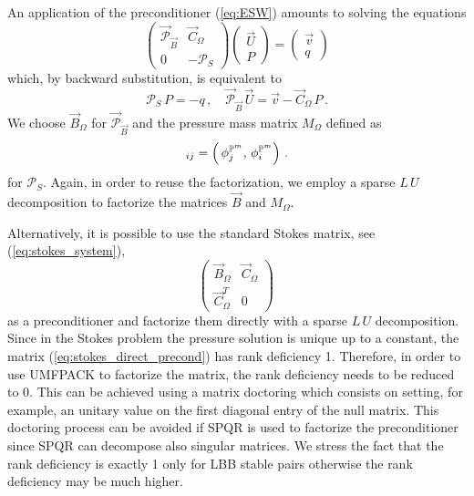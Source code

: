 An application of the preconditioner (\ref{eq:ESW}) amounts to solving the
equations
\begin{equation*}
\begin{pmatrix}
\vec{\mathcal{P}}_{\vec B} & \vec C_\Omega \\
0 & -\mathcal{P}_S
\end{pmatrix}
\begin{pmatrix} \vec U \\ P \end{pmatrix}
= \begin{pmatrix} \vec v \\ q \end{pmatrix}
\end{equation*}
which, by backward substitution, is equivalent to
\begin{equation}\label{eq:blocksolution}
\mathcal{P}_S\,P = -q\,,\quad \vec{\mathcal{P}}_{\vec B}\,\vec U = \vec v -
\vec C_\Omega\,P\,.
\end{equation}
We choose $\vec B_\Omega$  for $\vec{\mathcal{P}}_{\vec B}$ and the pressure
mass matrix $M_\Omega$ defined as
\begin{equation*}
[M_\Omega]_{ij} = \left(\,\phi_j^{\pspace^m},\, \phi_i^{\pspace^m}\right)\,.
\end{equation*}
for $\mathcal{P}_S$. Again, in order to reuse the factorization, we employ a
sparse $L\,U$ decomposition to factorize the matrices $\vec B$ and $M_\Omega$.

Alternatively, it is possible to use the standard Stokes matrix, see
(\ref{eq:stokes_system}),
\begin{equation}\label{eq:stokes_direct_precond}
\begin{pmatrix}
\vec B_\Omega & \vec C_\Omega \\
\vec C_\Omega^T & 0
\end{pmatrix}\,
\end{equation}
as a preconditioner and factorize them directly with a sparse $L\,U$
decomposition. Since in the Stokes problem the pressure solution is unique up
to a constant, the matrix (\ref{eq:stokes_direct_precond}) has rank deficiency
1. Therefore, in order to use UMFPACK to factorize the matrix, the rank
deficiency needs to be reduced to 0. This can be achieved using a matrix
doctoring which consists on setting, for example, an unitary value on the first
diagonal entry of the null matrix. This doctoring process can be avoided if SPQR
is used to factorize the preconditioner since SPQR can decompose also singular
matrices. We stress the fact that the rank deficiency is exactly 1 only for LBB
stable pairs otherwise the rank deficiency may be much higher.

